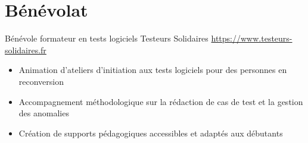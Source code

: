 \documentclass[a4paper, serif, 10pt]{moderncv}
\begin{document}
\section{Bénévolat}

        {Bénévole formateur en tests logiciels}
        {Testeurs Solidaires}
        {\url{https://www.testeurs-solidaires.fr}}
        {}
        {\begin{itemize}
\item Animation d'ateliers d'initiation aux tests logiciels pour des personnes en reconversion
\item Accompagnement méthodologique sur la rédaction de cas de test et la gestion des anomalies
\item Création de supports pédagogiques accessibles et adaptés aux débutants
\end{itemize}}
    
\end{document}
